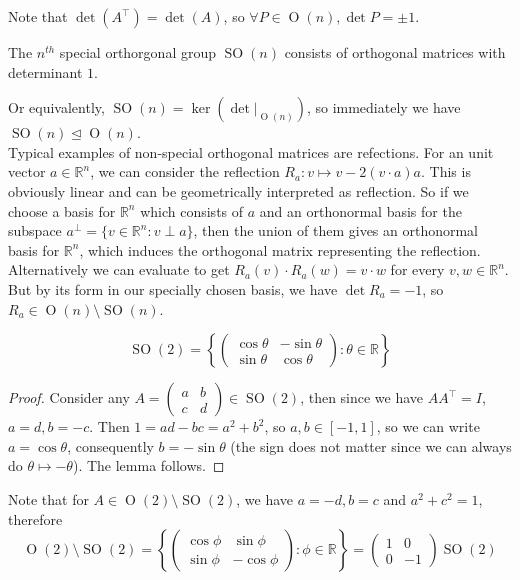 Note that $\det (A^\top)=\det (A)$, so $\forall P\in\operatorname{O}(n),\det P=\pm 1$.
\begin{definition}
    The $n^{th}$ special orthorgonal group $\operatorname{SO}(n)$ consists of orthogonal matrices with determinant $1$.
\end{definition}
Or equivalently, $\operatorname{SO}(n)=\ker(\det|_{\operatorname{O}(n)})$, so immediately we have $\operatorname{SO}(n)\unlhd\operatorname{O}(n)$.\\
Typical examples of non-special orthogonal matrices are refections.
For an unit vector $a\in\mathbb R^n$, we can consider the reflection $R_a:v\mapsto v-2(v\cdot a)a$.
This is obviously linear and can be geometrically interpreted as reflection.
So if we choose a basis for $\mathbb R^n$ which consists of $a$ and an orthonormal basis for the subspace $a^\perp=\{v\in\mathbb R^n:v\perp a\}$, then the union of them gives an orthonormal basis for $\mathbb R^n$, which induces the orthogonal matrix representing the reflection.
Alternatively we can evaluate to get $R_a(v)\cdot R_a(w)=v\cdot w$ for every $v,w\in\mathbb R^n$.
But by its form in our specially chosen basis, we have $\det R_a=-1$, so $R_a\in \operatorname{O}(n)\setminus\operatorname{SO}(n)$.
\begin{lemma}
    $$\operatorname{SO}(2)=\left\{\begin{pmatrix}
        \cos\theta&-\sin\theta\\
        \sin\theta&\cos\theta
    \end{pmatrix}:\theta\in\mathbb R\right\}$$
\end{lemma}
\begin{proof}
    Consider any $A=\left(\begin{smallmatrix}
        a&b\\
        c&d
    \end{smallmatrix}\right)\in\operatorname{SO}(2)$, then since we have $AA^\top=I$, $a=d,b=-c$.
    Then $1=ad-bc=a^2+b^2$, so $a,b\in [-1,1]$, so we can write $a=\cos\theta$, consequently $b=-\sin\theta$ (the sign does not matter since we can always do $\theta\mapsto -\theta$).
    The lemma follows.
\end{proof}
Note that for $A\in\operatorname{O}(2)\setminus\operatorname{SO}(2)$, we have $a=-d,b=c$ and $a^2+c^2=1$, therefore
$$\operatorname{O}(2)\setminus\operatorname{SO}(2)=\left\{\begin{pmatrix}
    \cos\phi&\sin\phi\\
    \sin\phi&-\cos\phi
\end{pmatrix}:\phi\in\mathbb R\right\}=\begin{pmatrix}
    1&0\\
    0&-1
\end{pmatrix}\operatorname{SO}(2)$$
